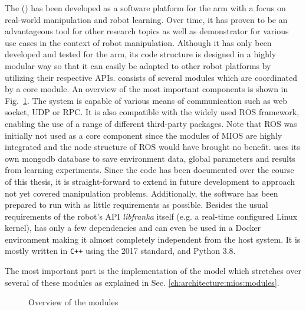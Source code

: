 The \software{} (\softwareabbr{}) has been developed as a software platform for the \platformname{} arm with a focus on real-world manipulation and robot learning.
Over time, it has proven to be an advantageous tool for other research topics as well as demonstrator for various use cases in the context of robot manipulation.
Although it has only been developed and tested for the \platformname{} arm, its code structure is designed in a highly modular way so that it can easily be adapted to other robot platforms by utilizing their respective APIs.
\softwareabbr{} consists of several modules which are coordinated by a core module.
An overview of the most important components is shown in Fig.~\ref{fig:architecture:mios:overview}.
The system is capable of various means of communication such as web socket, UDP or RPC.
It is also compatible with the widely used ROS framework, enabling the use of a range of different third-party packages.
Note that ROS was initially not used as a core component since the modules of MIOS are highly integrated and the node structure of ROS would have brought no benefit.
\softwareabbr{} uses its own mongodb database to save environment data, global parameters and results from learning experiments.
Since the code has been documented over the course of this thesis, it is straight-forward to extend in future development to approach not yet covered manipulation problems.
Additionally, the software has been prepared to run with as little requirements as possible.
Besides the usual requirements of the robot's API \emph{libfranka} itself (e.g. a real-time configured Linux kernel), \softwareabbr{} has only a few dependencies and can even be used in a Docker environment making it almost completely independent from the host system.
It is mostly written in \verb!C++! using the 2017 standard, and Python 3.8.

The most important part is the implementation of the \skillmodelabbr{} model which stretches over several of these modules as explained in Sec. \ref{ch:architecture:mios:modules}.

\begin{figure}[ht!]
\begin{center}

\caption{Overview of the \softwareabbr{} modules}
\label{fig:architecture:mios:overview}
\end{center}
\end{figure}
